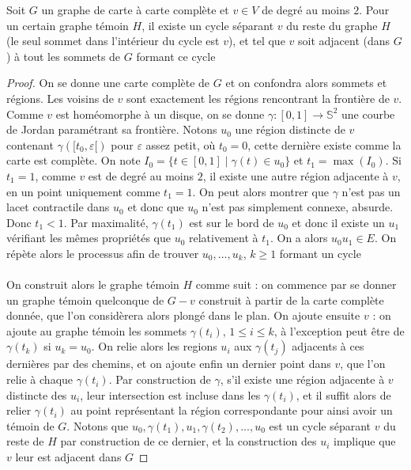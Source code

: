 \documentclass{scrartcl}
\begin{document}
\begin{flushleft}
\begin{lem}\label{cycleCompl}
    Soit $G$ un graphe de carte à carte complète et $v \in V$ de degré au moins $2$. Pour un certain graphe témoin $H$, il existe un cycle séparant $v$
    du reste du graphe $H$ (le seul sommet dans l'intérieur du cycle est $v$), et tel que $v$ soit adjacent (dans $G$) à tout les sommets
    de $G$ formant ce cycle
\end{lem}

\begin{proof}
    On se donne une carte complète de $G$ et on confondra alors sommets et régions. Les voisins de $v$ sont exactement les régions
    rencontrant la frontière de $v$. Comme $v$ est homéomorphe à un disque, on se donne $\gamma : [0, 1] \rightarrow \mathbb{S}^2$
    une courbe de Jordan paramétrant sa frontière. Notons $u_0$ une région distincte de $v$ contenant $\gamma([t_0, \varepsilon[)$ pour $\varepsilon$
    assez petit, où $t_0 = 0$, cette dernière existe comme la carte est complète. On note $I_0 = \{ t \in [0, 1] \mid \gamma(t) \in u_0 \}$
    et $t_1 = \max(I_0)$. Si $t_1 = 1$, comme $v$ est de degré au moins $2$, il existe une autre région adjacente à $v$, en un point uniquement
    comme $t_1 = 1$. On peut alors montrer que $\gamma$ n'est pas un lacet contractile dans $u_0$ et donc que $u_0$ n'est pas simplement connexe, absurde.
    Donc $t_1 < 1$. Par maximalité, $\gamma(t_1)$ est sur le bord de $u_0$ et donc il existe un $u_1$ vérifiant les mêmes propriétés que $u_0$
    relativement à $t_1$. On a alors $u_0u_1 \in E$. On répète alors le processus afin de trouver $u_0, ..., u_k$, $k \geq 1$ formant un cycle
    \\~\\
    On construit alors le graphe témoin $H$ comme suit : on commence par se donner un graphe témoin quelconque de $G - v$ construit à partir de la carte
    complète donnée, que l'on considèrera alors plongé dans le plan. On ajoute ensuite $v$ : on ajoute au graphe témoin les sommets
    $\gamma(t_i)$, $1 \leq i \leq k$, à l'exception peut être de $\gamma(t_k)$ si $u_k = u_0$. On relie alors les regions $u_i$ aux $\gamma(t_j)$
    adjacents à ces dernières par des chemins, et on ajoute enfin un dernier point dans $v$, que l'on relie à chaque $\gamma(t_i)$.
    Par construction de $\gamma$, s'il existe une région adjacente à $v$ distincte des $u_i$, leur intersection est incluse
    dans les $\gamma(t_i)$, et il suffit alors de relier $\gamma(t_i)$ au point représentant la région correspondante pour ainsi avoir
    un témoin de $G$. Notons que $u_0, \gamma(t_1), u_1, \gamma(t_2), ..., u_0$ est un cycle séparant $v$ du reste de $H$ par construction de ce dernier,
    et la construction des $u_i$ implique que $v$ leur est adjacent dans $G$
\end{proof}


\end{flushleft}
\end{document}
